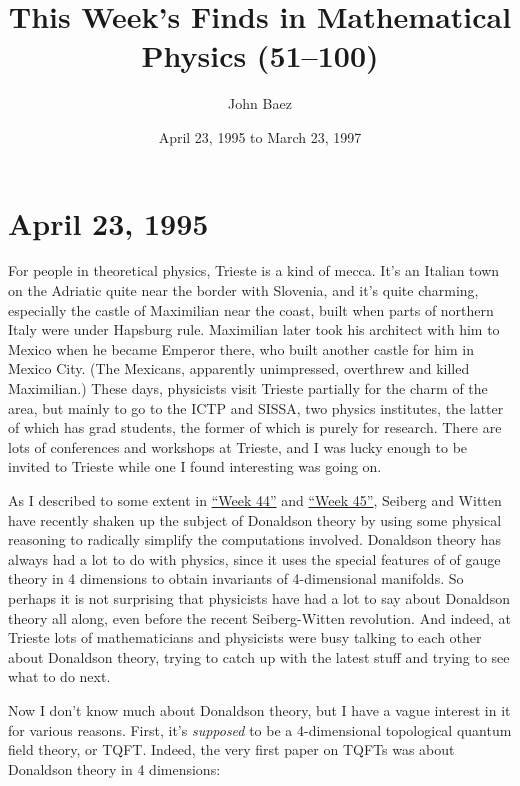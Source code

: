 \documentclass{article}
\title{This Week's Finds in Mathematical Physics (51--100)}
\author{John Baez}
\date{April 23, 1995 to March 23, 1997}
\begin{document}
\hypersetup{linkcolor=myrefcolor,citecolor=mycitecolor,urlcolor=myurlcolor}

\maketitle
\tableofcontents

\hypertarget{week51}{%
\section{April 23, 1995}\label{week51}}

For people in theoretical physics, Trieste is a kind of mecca. It's an
Italian town on the Adriatic quite near the border with Slovenia, and
it's quite charming, especially the castle of Maximilian near the coast,
built when parts of northern Italy were under Hapsburg rule. Maximilian
later took his architect with him to Mexico when he became Emperor
there, who built another castle for him in Mexico City. (The Mexicans,
apparently unimpressed, overthrew and killed Maximilian.) These days,
physicists visit Trieste partially for the charm of the area, but mainly
to go to the ICTP and SISSA, two physics institutes, the latter of which
has grad students, the former of which is purely for research. There are
lots of conferences and workshops at Trieste, and I was lucky enough to
be invited to Trieste while one I found interesting was going on.

As I described to some extent in \protect\hyperlink{week44}{``Week 44''}
and \protect\hyperlink{week45}{``Week 45''}, Seiberg and Witten have
recently shaken up the subject of Donaldson theory by using some
physical reasoning to radically simplify the computations involved.
Donaldson theory has always had a lot to do with physics, since it uses
the special features of of gauge theory in 4 dimensions to obtain
invariants of 4-dimensional manifolds. So perhaps it is not surprising
that physicists have had a lot to say about Donaldson theory all along,
even before the recent Seiberg-Witten revolution. And indeed, at Trieste
lots of mathematicians and physicists were busy talking to each other
about Donaldson theory, trying to catch up with the latest stuff and
trying to see what to do next.

Now I don't know much about Donaldson theory, but I have a vague
interest in it for various reasons. First, it's \emph{supposed} to be a
4-dimensional topological quantum field theory, or TQFT. Indeed, the
very first paper on TQFTs was about Donaldson theory in 4 dimensions:
\end{document}
